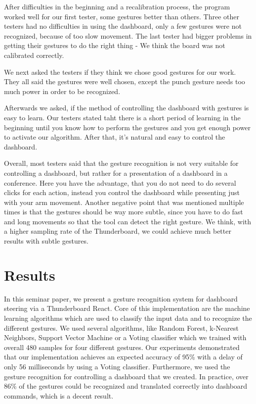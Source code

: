 After difficulties in the beginning and a recalibration process, the program worked well for our first tester, some gestures better than others.
Three other testers had no difficulties in using the dashboard, only a few gestures were not recognized, because of too slow movement.
The last tester had bigger problems in getting their gestures to do the right thing - We think the board was not calibrated correctly.

We next asked the testers if they think we chose good gestures for our work.
They all said the gestures were well chosen, except the punch gesture needs too much power in order to be recognized.

Afterwards we asked, if the method of controlling the dashboard with gestures is easy to learn.
Our testers stated taht there is a short period of learning in the beginning until you know how to perform the gestures and you get enough power to activate our algorithm.
After that, it's natural and easy to control the dashboard.

Overall, most testers said that the gesture recognition is not very suitable for controlling a dashboard, but rather for a presentation of a dashboard in a conference.
Here you have the advantage, that you do not need to do several clicks for each action, instead you control the dashboard while presenting just with your arm movement.
Another negative point that was mentioned multiple times is that the gestures should be way more subtle, since you have to do fast and long movements so that the tool can detect the right gesture.
We think, with a higher sampling rate of the Thunderboard, we could achieve much better results with subtle gestures.

\chapter{Results}
\label{ch:Results}

In this seminar paper, we present a gesture recognition system for dashboard steering via a Thunderboard React. 
Core of this implementation are the machine learning algorithms which are used to classify the input data and to recognize the different gestures. 
We used several algorithms, like Random Forest, k-Nearest Neighbors, Support Vector Machine or a Voting classifier which we trained with overall 480 samples for four different gestures. 
Our experiments demonstrated that our implementation achieves an expected accuracy of 95\% with a delay of only 56 milliseconds by using a Voting classifier. 
Furthermore, we used the gesture recognition for controlling a dashboard that we created. 
In practice, over 86\% of the gestures could be recognized and translated correctly into dashboard commands, which is a decent result. 

